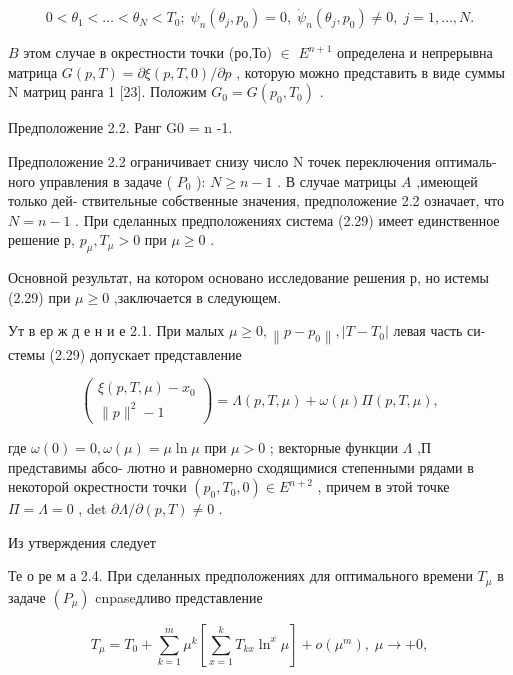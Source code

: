 \documentclass[10pt]{article}
\begin{document}
\[
0 < {\theta }_{1} < \ldots  < {\theta }_{N} < {T}_{0};\;{\psi }_{n}\left( {{\theta }_{j},{p}_{0}}\right)  = 0,\;{\dot{\psi }}_{n}\left( {{\theta }_{j},{p}_{0}}\right)  \neq  0,\;j = 1,\ldots ,N.
\]

\(B\) этом случае в окрестности точки (ро,То) \(\in\) \({E}^{n + 1}\) определена и непрерывна матрица \(G\left( {p,T}\right)  = \partial \xi \left( {p,T,0}\right) /\partial p\) , которую можно представить в виде суммы N матриц ранга 1 [23]. Положим \({G}_{0} = G\left( {{p}_{0},{T}_{0}}\right)\) .

Предположение 2.2. Ранг G0 = n -1.

Предположение 2.2 ограничивает снизу число N точек переключения оптималь- ного управления в задаче ( \({P}_{0}\) ): \(N \geq  n - 1\) . В случае матрицы \(A\) ,имеющей только дей- ствительные собственные значения, предположение 2.2 означает, что \(N = n - 1\) . При сделанных предположениях система (2.29) имеет единственное решение р, \({p}_{\mu },{T}_{\mu } > 0\) при \(\mu  \geq  0\) .

Основной результат, на котором основано исследование решения р, но истемы (2.29) при \(\mu  \geq  0\) ,заключается в следующем.

Ут в ер ж д е н и е 2.1. При малых \(\mu  \geq  0,\left\lVert {p - {p}_{0}} \right\rVert,\left| {T - {T}_{0}}\right|\) левая часть си- стемы (2.29) допускает представление

\[
\left( \begin{array}{c} \xi \left( {p,T,\mu }\right)  - {x}_{0} \\  \parallel p{\parallel }^{2} - 1 \end{array}\right)  = \Lambda \left( {p,T,\mu }\right)  + \omega \left( \mu \right) \Pi \left( {p,T,\mu }\right) ,
\]

где \(\omega \left( 0\right)  = 0,\omega \left( \mu \right)  = \mu \ln \mu\) при \(\mu  > 0\) ; векторные функции \(\Lambda\) ,П представимы абсо- лютно и равномерно сходящимися степенными рядами в некоторой окрестности точки \(\left( {{p}_{0},{T}_{0},0}\right)  \in  {E}^{n + 2}\) , причем в этой точке \(\Pi = \Lambda = 0\) , det \(\partial \Lambda /\partial \left( {p,T}\right)  \neq  0\) .

Из утверждения следует

Те о ре м а 2.4. При сделанных предположениях для оптимального времени \({T}_{\mu }\) в задаче \(\left( {P}_{\mu }\right)\) cnpaseдливо представление

\[
{T}_{\mu } = {T}_{0} + \mathop{\sum }\limits_{{k = 1}}^{m}{\mu }^{k}\left[  {\mathop{\sum }\limits_{{x = 1}}^{k}{T}_{kx}{\ln }^{x}\mu }\right]   + o\left( {\mu }^{m}\right) ,\;\mu  \rightarrow   + 0, \tag{2.31}
\]
\end{document}
